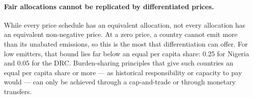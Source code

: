 \documentclass[12pt,english]{article}
\theoremstyle{remark}
\begin{document}
\paragraph{Fair allocations cannot be replicated by differentiated prices.} 
While every price schedule has an equivalent allocation, not every allocation has an equivalent non-negative price. At a zero price, a country cannot emit more than its unabated emissions, so this is the most that differentiation can offer. %
For low emitters, that bound lies far below an equal per capita share: 0.25 for Nigeria and 0.05 for the DRC. 
Burden-sharing principles that give such countries an equal per capita share or more --- as historical responsibility or capacity to pay would --- can only be achieved through a cap-and-trade or through monetary transfers. 


\end{document}
